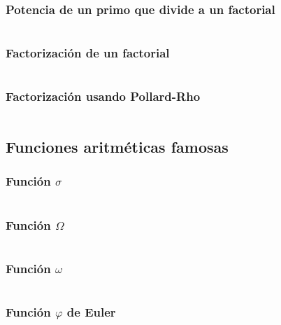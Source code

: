 \documentclass[11pt]{article}
\begin{document}
			\subsubsection{Potencia de un primo que divide a un factorial}
			\inputminted[tabsize=2,breaklines,firstline=418,lastline=422,fontsize=\small]{c++}{numberTheory.cpp}
			
			\subsubsection{Factorización de un factorial}
			\inputminted[tabsize=2,breaklines,firstline=424,lastline=431,fontsize=\small]{c++}{numberTheory.cpp}
			
			\subsubsection{Factorización usando Pollard-Rho}
			\inputminted[tabsize=2,breaklines,firstline=657,lastline=705,fontsize=\small]{c++}{numberTheory.cpp}
		
		\subsection{Funciones aritméticas famosas}
			\subsubsection{Función $\sigma$}
			\inputminted[tabsize=2,breaklines,firstline=209,lastline=226,fontsize=\small]{c++}{numberTheory.cpp}
			
			\subsubsection{Función $\Omega$}
			\inputminted[tabsize=2,breaklines,firstline=228,lastline=235,fontsize=\small]{c++}{numberTheory.cpp}
			
			\subsubsection{Función $\omega$}
			\inputminted[tabsize=2,breaklines,firstline=237,lastline=244,fontsize=\small]{c++}{numberTheory.cpp}
			
			\subsubsection{Función $\varphi$ de Euler}
			\inputminted[tabsize=2,breaklines,firstline=251,lastline=258,fontsize=\small]{c++}{numberTheory.cpp}
			
\end{document}
